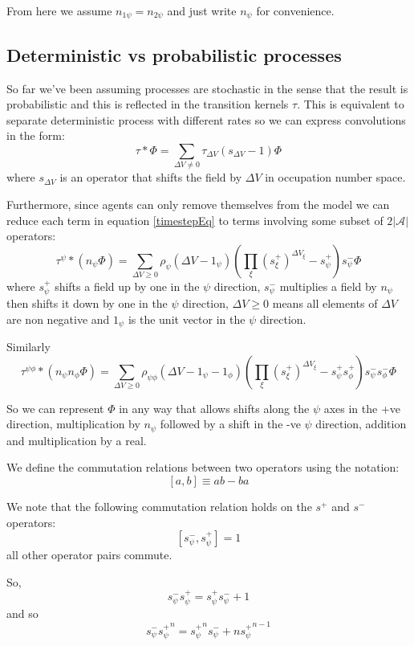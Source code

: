 \documentclass[a4paper]{article}
\begin{document}
From here we assume $n_{1\psi} = n_{2\psi}$ and just write $n_\psi$ for convenience.

\subsection{Deterministic vs probabilistic processes}

So far we've been assuming processes are stochastic in the sense that the result is probabilistic and this is reflected in the transition kernels $\tau$. This is equivalent to separate deterministic process with different rates so we can express convolutions in the form:
\[
\tau \ast \Phi = \sum_{\Delta V \ne 0} \tau_{\Delta V}(s_{\Delta V} - 1)\Phi
\]
where $s_{\Delta V}$ is an operator that shifts the field by $\Delta V$ in occupation number space.

Furthermore, since agents can only remove themselves from the model we can reduce each term in equation \ref{timestepEq} to terms involving some subset of $2|\mathcal{A}|$ operators:
\[
\tau^\psi \ast (n_\psi\Phi) = 
\sum_{\Delta V \ge 0 }
\rho_\psi(\Delta V - 1_\psi)
\left(
\prod_{\xi} \left( s^+_\xi\right)^{\Delta V_\xi}  - s^+_\psi
\right)
s^-_\psi \Phi 
\]
where $s^+_\psi$ shifts a field up by one in the $\psi$ direction, $s^-_\psi$ multiplies a field by $n_\psi$ then shifts it down by one in the $\psi$ direction, $\Delta V \ge 0$ means all elements of $\Delta V$ are non negative and $1_\psi$ is the unit vector in the $\psi$ direction.

Similarly 
\[
\tau^{\psi\phi} \ast (n_\psi n_\phi \Phi) = 
\sum_{\Delta V \ge 0}
\rho_{\psi\phi}(\Delta V - 1_\psi - 1_\phi)
\left(
\prod_\xi \left(s^+_\xi\right)^{\Delta V_\xi} - s^+_\psi s^+_\phi
\right)
s^-_\psi s^-_\phi \Phi 
\]

So we can represent $\Phi$ in any way that allows shifts along the $\psi$ axes in the +ve direction, multiplication by $n_\psi$ followed by a shift in the -ve $\psi$ direction, addition and multiplication by a real.

We define the commutation relations between two operators using the notation:
\[
[a,b] \equiv ab - ba
\]

We note that the following commutation relation holds on the $s^+$ and $s^-$ operators:
\[
[s^-_\psi, s^+_\psi] = 1
\]
all other operator pairs commute.

So,
\[
s^-_\psi s^+_\psi = s^+_\psi s^-_\psi + 1
\]
and so
\[
s^-_\psi \left.s^+_\psi\right.^n = \left.s^+_\psi\right.^n s^-_\psi  + n\left.s^+_\psi\right.^{n-1}
\]
\end{document}
